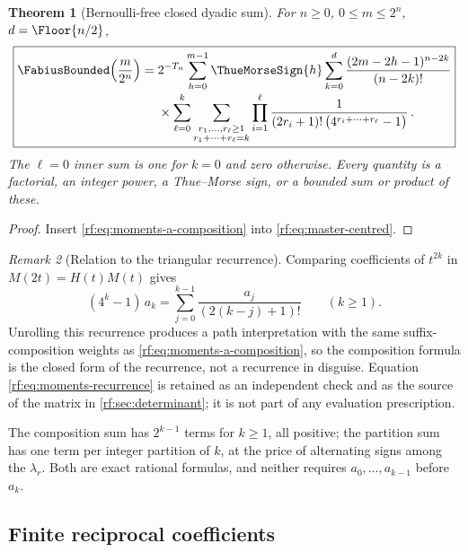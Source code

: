 \documentclass[11pt,oneside]{article}
\theoremstyle{plain}
\newtheorem{theorem}{Theorem}[section]
\theoremstyle{definition}
\theoremstyle{remark}
\newtheorem{remark}[theorem]{Remark}
\newcommand{\Fb}{\FabiusBounded}            %
\newcommand{\tm}[1]{\ThueMorseSign{#1}}     %
\newcommand{\Tr}[1]{T_{#1}}                 %
\begin{document}
\begin{theorem}[Bernoulli-free closed dyadic sum]
\label{rf:thm:composition-value}
For $n\ge0$, $0\le m\le2^{n}$, $d=\Floor{n/2}$,
\begin{equation}
 \boxed{\begin{aligned}
 \Fb\!\left(\frac{m}{2^{n}}\right)={}&2^{-\Tr{n}}\sum_{h=0}^{m-1}\tm{h}
   \sum_{k=0}^{d}\frac{(2m-2h-1)^{n-2k}}{(n-2k)!}\\[-0.2em]
 &\times\sum_{\ell=0}^{k}\sum_{\substack{r_{1},\ldots,r_{\ell}\ge1\\ r_{1}+\cdots+r_{\ell}=k}}
   \prod_{i=1}^{\ell}\frac{1}{(2r_{i}+1)!\,\bigl(4^{r_{i}+\cdots+r_{\ell}}-1\bigr)}\,.
 \end{aligned}}
 \label{rf:eq:composition-value}
\end{equation}
The $\ell=0$ inner sum is one for $k=0$ and zero otherwise.  Every quantity
is a factorial, an integer power, a Thue--Morse sign, or a bounded sum or
product of these.
\end{theorem}

\begin{proof}
Insert \cref{rf:eq:moments-a-composition} into \cref{rf:eq:master-centred}.
\end{proof}

\begin{remark}[Relation to the triangular recurrence]
\label{rf:rmk:moments-recurrence}
Comparing coefficients of $t^{2k}$ in $M(2t)=H(t)M(t)$ gives
\begin{equation}
 (4^{k}-1)\,a_{k}=\sum_{j=0}^{k-1}\frac{a_{j}}{(2(k-j)+1)!}\qquad(k\ge1).
 \label{rf:eq:moments-recurrence}
\end{equation}
Unrolling this recurrence produces a path interpretation with the same
suffix-composition weights as \cref{rf:eq:moments-a-composition}, so the
composition formula is the closed form of the recurrence, not a recurrence
in disguise.  Equation \cref{rf:eq:moments-recurrence} is retained as an
independent check and as the source of the matrix in
\cref{rf:sec:determinant}; it is not part of any evaluation prescription.
\end{remark}

The composition sum has $2^{k-1}$ terms for $k\ge1$, all positive; the
partition sum has one term per integer partition of $k$, at the price of
alternating signs among the $\lambda_{r}$.  Both are exact rational
formulas, and neither requires $a_{0},\ldots,a_{k-1}$ before $a_{k}$.

\subsection{Finite reciprocal coefficients}
\label{rf:sec:moments-reciprocal}
\end{document}
